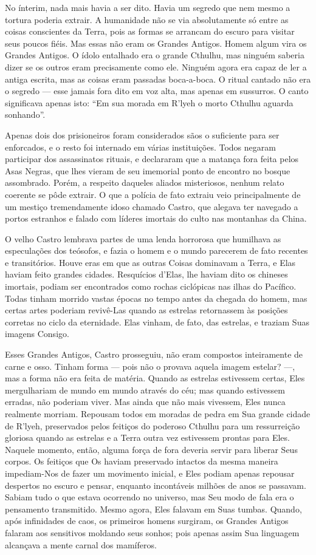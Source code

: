 No ínterim, nada mais havia a ser dito. Havia um segredo que nem mesmo a
tortura poderia extrair. A humanidade não se via absolutamente só entre
as coisas conscientes da Terra, pois as formas se arrancam do escuro
para visitar seus poucos fiéis. Mas essas não eram os Grandes Antigos.
Homem algum vira os Grandes Antigos. O ídolo entalhado era o grande
Cthulhu, mas ninguém saberia dizer se os outros eram precisamente como
ele. Ninguém agora era capaz de ler a antiga escrita, mas as coisas eram
passadas boca-a-boca. O ritual cantado não era o segredo --- esse jamais
fora dito em voz alta, mas apenas em sussurros. O canto significava
apenas isto: ``Em sua morada em R'lyeh o morto Cthulhu aguarda
sonhando''.

Apenas dois dos prisioneiros foram considerados sãos o suficiente para
ser enforcados, e o resto foi internado em várias instituições. Todos
negaram participar dos assassinatos rituais, e declararam que a matança
fora feita pelos Asas Negras, que lhes vieram de seu imemorial ponto de
encontro no bosque assombrado. Porém, a respeito daqueles aliados
misteriosos, nenhum relato coerente se pôde extrair. O que a polícia de
fato extraiu veio principalmente de um mestiço tremendamente idoso
chamado Castro, que alegava ter navegado a portos estranhos e falado com
líderes imortais do culto nas montanhas da China.

O velho Castro lembrava partes de uma lenda horrorosa que humilhava as
especulações dos teósofos, e fazia o homem e o mundo parecerem de fato
recentes e transitórios. Houve eras em que as outras Coisas dominavam a
Terra, e Elas haviam feito grandes cidades. Resquícios d'Elas, lhe
haviam dito os chineses imortais, podiam ser encontrados como rochas
ciclópicas nas ilhas do Pacífico. Todas tinham morrido vastas épocas no
tempo antes da chegada do homem, mas certas artes poderiam revivê-Las
quando as estrelas retornassem às posições corretas no ciclo da
eternidade. Elas vinham, de fato, das estrelas, e traziam Suas imagens
Consigo.

Esses Grandes Antigos, Castro prosseguiu, não eram compostos
inteiramente de carne e osso. Tinham forma --- pois não o provava aquela
imagem estelar? ---, mas a forma não era feita de matéria. Quando as
estrelas estivessem certas, Eles mergulhariam de mundo em mundo através
do céu; mas quando estivessem erradas, não poderiam viver. Mas ainda que
não mais vivessem, Eles nunca realmente morriam. Repousam todos em
moradas de pedra em Sua grande cidade de R'lyeh, preservados pelos
feitiços do poderoso Cthulhu para um ressurreição gloriosa quando as
estrelas e a Terra outra vez estivessem prontas para Eles. Naquele
momento, então, alguma força de fora deveria servir para liberar Seus
corpos. Os feitiços que Os haviam preservado intactos da mesma maneira
impediam-Nos de fazer um movimento inicial, e Eles podiam apenas
repousar despertos no escuro e pensar, enquanto incontáveis milhões de
anos se passavam. Sabiam tudo o que estava ocorrendo no universo, mas
Seu modo de fala era o pensamento transmitido. Mesmo agora, Eles falavam
em Suas tumbas. Quando, após infinidades de caos, os primeiros homens
surgiram, os Grandes Antigos falaram aos sensitivos moldando seus
sonhos; pois apenas assim Sua linguagem alcançava a mente carnal dos
mamíferos.

